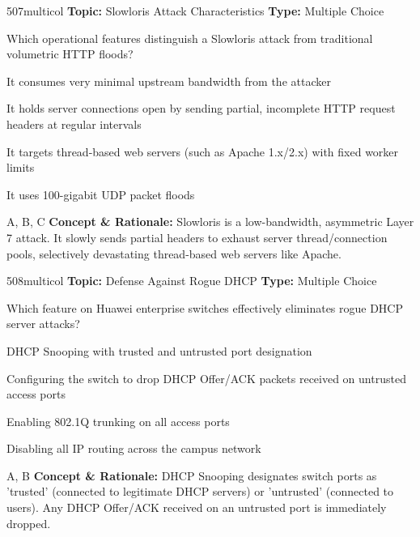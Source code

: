 \begin{qcard}{507}{multicol}
\textcolor{darkslate!75}{\small\textbf{Topic:} Slowloris Attack Characteristics \hfill \textbf{Type:} Multiple Choice}\vspace{0.4em}\par
Which operational features distinguish a Slowloris attack from traditional volumetric HTTP floods?
\begin{qoptions}
\item It consumes very minimal upstream bandwidth from the attacker
\item It holds server connections open by sending partial, incomplete HTTP request headers at regular intervals
\item It targets thread-based web servers (such as Apache 1.x/2.x) with fixed worker limits
\item It uses 100-gigabit UDP packet floods
\end{qoptions}
\end{qcard}
\nopagebreak
\begin{explainbox}{A, B, C}
\textbf{Concept \& Rationale:} Slowloris is a low-bandwidth, asymmetric Layer 7 attack. It slowly sends partial headers to exhaust server thread/connection pools, selectively devastating thread-based web servers like Apache.
\end{explainbox}

\begin{qcard}{508}{multicol}
\textcolor{darkslate!75}{\small\textbf{Topic:} Defense Against Rogue DHCP \hfill \textbf{Type:} Multiple Choice}\vspace{0.4em}\par
Which feature on Huawei enterprise switches effectively eliminates rogue DHCP server attacks?
\begin{qoptions}
\item DHCP Snooping with trusted and untrusted port designation
\item Configuring the switch to drop DHCP Offer/ACK packets received on untrusted access ports
\item Enabling 802.1Q trunking on all access ports
\item Disabling all IP routing across the campus network
\end{qoptions}
\end{qcard}
\nopagebreak
\begin{explainbox}{A, B}
\textbf{Concept \& Rationale:} DHCP Snooping designates switch ports as 'trusted' (connected to legitimate DHCP servers) or 'untrusted' (connected to users). Any DHCP Offer/ACK received on an untrusted port is immediately dropped.
\end{explainbox}

